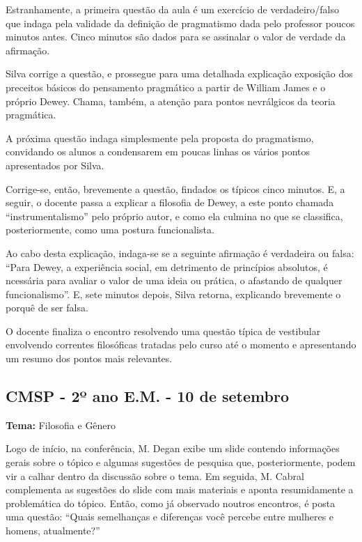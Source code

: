 \documentclass[12pt,a4paper]{article}
\begin{document}
	Estranhamente, a primeira questão da aula é um exercício 
	de verdadeiro/falso que indaga pela validade da definição 
	de pragmatismo dada pelo professor poucos minutos antes. 
	Cinco minutos são dados para se assinalar o valor de verdade 
	da afirmação. 

	Silva corrige a questão, e prossegue para uma detalhada 
	explicação exposição dos preceitos básicos do pensamento 
	pragmático a partir de William James e o próprio Dewey. 
	Chama, também, a atenção para pontos nevrálgicos 
	da teoria pragmática. 

	A próxima questão indaga simplesmente pela proposta do 
	pragmatismo, convidando os alunos a condensarem em poucas 
	linhas os vários pontos apresentados por Silva. 

	Corrige-se, então, brevemente a questão, findados os típicos 
	cinco minutos. E, a seguir, o docente passa a explicar a 
	filosofia de Dewey, a este ponto chamada “instrumentalismo” 
	pelo próprio autor, e como ela culmina no que se classifica, 
	posteriormente, como uma postura funcionalista. 

	Ao cabo desta explicação, indaga-se se a seguinte afirmação 
	é verdadeira ou falsa: “Para Dewey, a experiência social, em 
	detrimento de princípios absolutos, é ncessária para avaliar 
	o valor de uma ideia ou prática, o afastando de qualquer 
	funcionalismo”. E, sete minutos depois, Silva retorna, 
	explicando brevemente o porquê de ser falsa. 

	O docente finaliza o encontro resolvendo uma questão típica 
	de vestibular envolvendo correntes filosóficas tratadas pelo 
	curso até o momento e apresentando um resumo dos pontos 
	mais relevantes. 

	\subsection{CMSP - 2º ano E.M. - 10 de setembro}

	\textbf{Tema:} Filosofia e Gênero

	Logo de início, na conferência, M. Degan exibe um slide contendo 
	informações gerais sobre o tópico e algumas sugestões de pesquisa 
	que, posteriormente, podem vir a calhar dentro da discussão sobre 
	o tema. Em seguida, M. Cabral complementa as sugestões do slide 
	com mais materiais e aponta resumidamente a problemática do tópico. 
	Então, como já observado noutros encontros, é posta uma questão: 
	“Quais semelhanças e diferenças você percebe entre mulheres e 
	homens, atualmente?”
\end{document}
